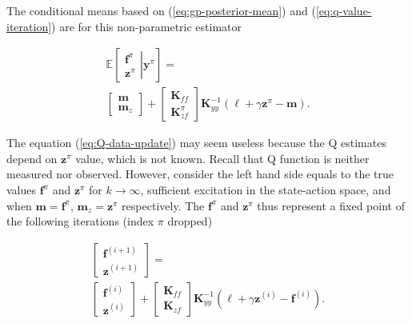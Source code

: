 \documentclass{ifacconf}
\begin{document}
The conditional means based on (\ref{eq:gp-posterior-mean}) and (\ref{eq:q-value-iteration}) are for this non-parametric estimator 

\begin{multline}
\mathbb{E\left[\mathit{\left.\begin{array}{c}
\mathbf{f}^{\pi}\\
\mathbf{z}^{\pi}
\end{array}\right|\mathbf{\mathit{\mathbf{y}}}^{\pi}}\right]}=\\
\left[\begin{array}{c}
\mathbf{m}\\
\mathbf{m}_{z}
\end{array}\right]+\left[\begin{array}{c}
\mathbf{K}_{ff}\\
\mathbf{K}_{zf}^{\pi}
\end{array}\right]\mathbf{K}_{yy}^{-1}\left(\mathbf{\boldsymbol{\ell}}+\gamma\mathbf{z}^{\pi}-\mathbf{m}\right).\label{eq:Q-data-update}
\end{multline}

The equation (\ref{eq:Q-data-update}) may seem useless because
the Q estimates depend on $\mathbf{z}^{\pi}$ value, which is not
known. Recall that Q function is neither measured nor observed. However,
consider the left hand side equals to the true values \textbf{$\mathbf{f}^{\pi}$}
and $\mathbf{z}^{\pi}$ for $k\rightarrow\infty$, sufficient excitation
in the state-action space, and when $\mathbf{m}=\mathbf{f}^{\pi}$,
$\mathbf{m}_{z}=\mathbf{z}^{\pi}$ respectively. The \textbf{$\mathbf{f}^{\pi}$}
and $\mathbf{z}^{\pi}$ thus represent a fixed point of the following
iterations (index $\pi$ dropped)

\begin{multline}
\left[\begin{array}{c}
\mathbf{f}^{(i+1)}\\
\mathbf{z}^{(i+1)}
\end{array}\right]=\\
\left[\begin{array}{c}
\mathbf{f}^{(i)}\\
\mathbf{z}^{(i)}
\end{array}\right]+\left[\begin{array}{c}
\mathbf{K}_{ff}\\
\mathbf{K}_{zf}
\end{array}\right]\mathbf{K}_{yy}^{-1}\left(\boldsymbol{\ell}+\gamma\mathbf{z}^{(i)}-\mathbf{f}^{(i)}\right).\label{eq:GPR-iterations}
\end{multline}
\end{document}
